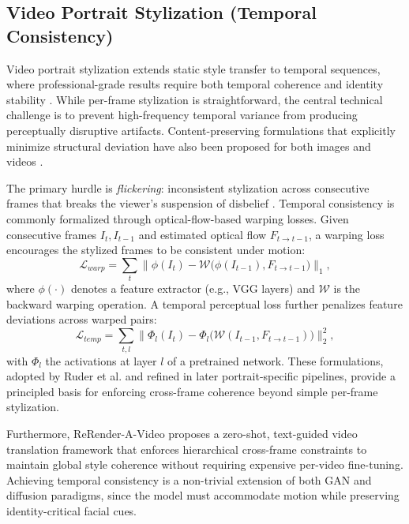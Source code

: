 \documentclass[journal]{IEEEtran}
\begin{document}
\subsection{Video Portrait Stylization (Temporal Consistency)}
\label{sec:advanced:video}
Video portrait stylization extends static style transfer to temporal sequences, where professional-grade results require both temporal coherence and identity stability \cite{ruder2018artistic,ye2024stylemastersy,huang2023styleavideoad,yang2023rerender,liu2023portraitdt,yang2024fresco}. While per-frame stylization is straightforward, the central technical challenge is to prevent high-frequency temporal variance from producing perceptually disruptive artifacts. Content-preserving formulations that explicitly minimize structural deviation have also been proposed for both images and videos \cite{zhang2026telestylecontentpreservingstyletransfer}.

The primary hurdle is \emph{flickering}: inconsistent stylization across consecutive frames that breaks the viewer's suspension of disbelief \cite{ye2024stylemastersy}. Temporal consistency is commonly formalized through optical-flow-based warping losses. Given consecutive frames $I_t, I_{t-1}$ and estimated optical flow $F_{t\to t-1}$, a warping loss encourages the stylized frames to be consistent under motion:
\begin{equation}
\mathcal{L}_{warp} = \sum_{t} \bigl\lVert \phi(I_t) - \mathcal{W}\bigl(\phi(I_{t-1}), F_{t\to t-1}\bigr) \bigr\rVert_1,
\end{equation}
where $\phi(\cdot)$ denotes a feature extractor (e.g., VGG layers) and $\mathcal{W}$ is the backward warping operation. A temporal perceptual loss further penalizes feature deviations across warped pairs:
\begin{equation}
\mathcal{L}_{temp} = \sum_{t,l} \bigl\lVert \Phi_l(I_t) - \Phi_l\bigl(\mathcal{W}(I_{t-1}, F_{t\to t-1})\bigr) \bigr\rVert_2^2,
\end{equation}
with $\Phi_l$ the activations at layer $l$ of a pretrained network. These formulations, adopted by Ruder et al. \cite{ruder2018artistic} and refined in later portrait-specific pipelines, provide a principled basis for enforcing cross-frame coherence beyond simple per-frame stylization.

Furthermore, ReRender-A-Video \cite{yang2023rerender} proposes a zero-shot, text-guided video translation framework that enforces hierarchical cross-frame constraints to maintain global style coherence without requiring expensive per-video fine-tuning. Achieving temporal consistency is a non-trivial extension of both GAN and diffusion paradigms, since the model must accommodate motion while preserving identity-critical facial cues.
\end{document}
